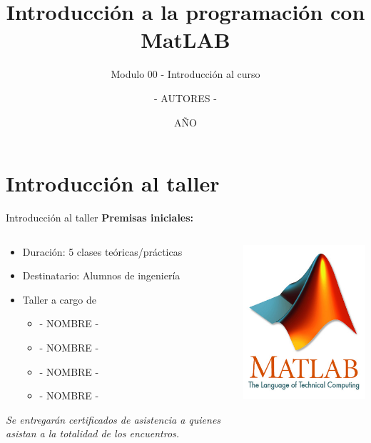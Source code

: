 \documentclass{bredelebeamer}
\title[Programación en MatLAB]{Introducción a la programación con MatLAB}
\subtitle{Modulo 00 - Introducción al curso}
\author{- AUTORES - \inst{1}}
\institute[UNIVERSIDAD]
{
  \inst{1}%
  - NOMBRE UNIVERSIDAD - 
  }
\date{AÑO}
\begin{document}
\begin{frame}
  \titlepage 
\end{frame}



\section{Introducción al taller}

\begin{frame}{Introducción al taller}
\textbf{Premisas iniciales:}
\begin{columns}
\begin{column}{0.5\textwidth}
\begin{itemize}
\item Duración: 5 clases teóricas/prácticas
\item Destinatario: Alumnos de ingeniería
\item Taller a cargo de
\begin{itemize}
\item - NOMBRE - 
\item - NOMBRE - 
\item - NOMBRE -
\item - NOMBRE -
\end{itemize}
\end{itemize}
\begin{center}
\textit{Se entregarán certificados de asistencia a quienes asistan a la totalidad de los encuentros.
}\end{center}
\end{column}
\begin{column}{0.3\textwidth}
\includegraphics[scale=0.3]{images/matlab.jpg}
\end{column}
\end{columns}
\end{frame}
\end{document}
